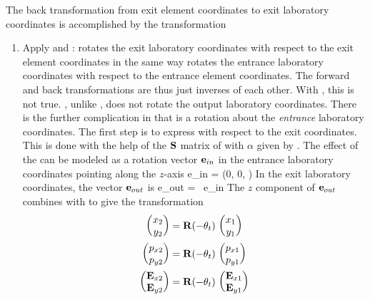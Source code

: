 The back transformation from exit element coordinates to exit
laboratory coordinates is accomplished by the transformation
  \begin{enumerate}
  \item
Apply  and :  rotates the exit
laboratory coordinates with respect to the exit element coordinates in
the same way  rotates the entrance laboratory coordinates
with respect to the entrance element coordinates. The forward and back
transformations are thus just inverses of each other.  With
, this is not true. , unlike , does
not rotate the output laboratory coordinates.  There is the further
complication in that  is a rotation about the {\em
entrance} laboratory coordinates. The first step is to express
 with respect to the exit coordinates. This is done with
the help of the ${\bf S}$ matrix of  with $\alpha$ given by
. The effect of the  can be modeled as a rotation
vector ${\bf e}_{in}$ in the entrance laboratory coordinates pointing
along the $z$-axis
\Begineq
 \Bf e_{in} = (0, 0, )
\Endeq
In the exit laboratory coordinates, the vector ${\bf e}_{out}$ is
\Begineq
  \Bf e_{out} = \bfS \, \Bf e_{in}
\Endeq
The $z$ component of ${\bf e}_{out}$ combines with  to give
the transformation
\begin{align}
  \begin{pmatrix} x_2 \\ y_2 \end{pmatrix} &=
    {\bf R} (-\theta_{t}) \,   \begin{pmatrix} x_1 \\ y_1 \end{pmatrix} \nonumber \\
  \begin{pmatrix} p_{x2} \\ p_{y2} \end{pmatrix} &=
    {\bf R} (-\theta_{t}) \,   \begin{pmatrix} p_{x1} \\ p_{y1} \end{pmatrix} \\
  \begin{pmatrix} {\bf E}_{x2} \\ {\bf E}_{y2} \end{pmatrix} &=
    {\bf R} (-\theta_{t}) \,   \begin{pmatrix} {\bf E}_{x1} \\ {\bf E}_{y1} \end{pmatrix} \nonumber
\end{align}

\end{enumerate}
